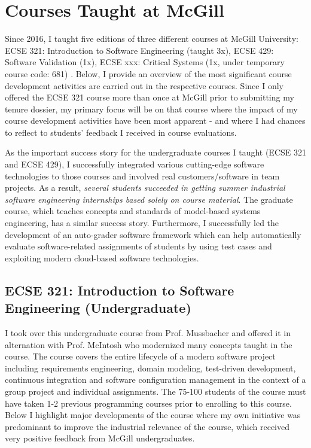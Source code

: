 \section{Courses Taught at McGill}
Since 2016, I taught five editions of three different courses at McGill University: ECSE 321: Introduction to Software Engineering (taught 3x), ECSE 429: Software Validation (1x), ECSE xxx: Critical Systems (1x, under temporary course code: 681) . Below, I provide an overview of the most significant course development activities are carried out in the respective courses. 
Since I only offered the ECSE 321 course more than once at McGill prior to submitting my tenure dossier, my primary focus will be on that course where the impact of my course development activities have been most apparent - and where I had chances to reflect to students' feedback I received in course evaluations.  

As the important success story for the undergraduate courses I taught (ECSE 321 and ECSE 429), I successfully integrated various cutting-edge software technologies to those courses and involved real customers/software in team projects. As a result, \emph{several students succeeded in getting summer industrial software engineering internships based solely on course material}. The graduate course, which teaches concepts and standards of model-based systems engineering, has a similar success story. Furthermore, I successfully led the development of an auto-grader software framework which can help automatically evaluate software-related assignments of students by using test cases and exploiting modern cloud-based software technologies.

\subsection{ECSE 321: Introduction to Software Engineering (Undergraduate)}
I took over this undergraduate course from Prof. Mussbacher and offered it in alternation with Prof. McIntosh who modernized many concepts taught in the course. The course covers the entire lifecycle of a modern software project including requirements engineering, domain modeling, test-driven development, continuous integration and software configuration management in the context of a group project and individual assignments. The 75-100 students of the course must have taken 1-2 previous programming courses prior to enrolling to this course. Below I highlight major developments of the course where my own initiative was predominant to improve the industrial relevance of the course, which received very positive feedback from McGill undergraduates. 


